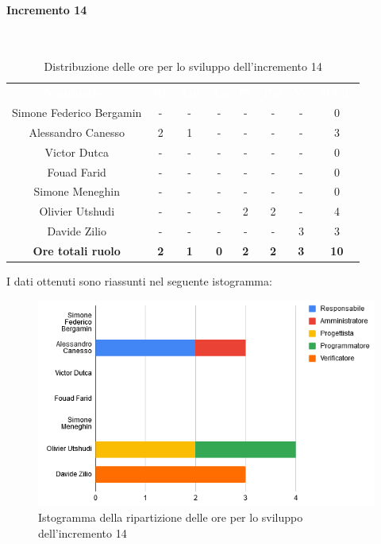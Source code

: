 \paragraph*{Incremento 14} \mbox{} \\
\begin{table}[H]
\centering\renewcommand{\arraystretch}{1.5}
\caption{Distribuzione delle ore per lo sviluppo dell'incremento 14}
\vspace{0.2cm}
\begin{tabular}{ c c c c c c c c }
\rowcolor{redafk}
\textcolor{white}{\textbf{Nominativo}} & \textcolor{white}{\textbf{Re}} &
\textcolor{white}{\textbf{Am}} & \textcolor{white}{\textbf{An}} &
\textcolor{white}{\textbf{Pt}} & \textcolor{white}{\textbf{Pm}} &
\textcolor{white}{\textbf{Ve}} & \textcolor{white}{\textbf{Totale}} \\
Simone Federico Bergamin & - & - & - & - & - & - & 0 \\
Alessandro Canesso & 2 & 1 & - & - & - & - & 3\\
Victor Dutca & - & - & - & - & - & - & 0 \\
Fouad Farid & - & - & - & - & - & - & 0 \\
Simone Meneghin & - & - & - & - & - & - & 0 \\
Olivier Utshudi & - & - & - & 2 & 2 & - & 4 \\
Davide Zilio & - & - & - &- & - & 3 & 3 \\
\rowcolor{lastrowcolor}
\textbf{Ore totali ruolo} & \textbf{2} & \textbf{1} & \textbf{0} & \textbf{2} & \textbf{2} & \textbf{3} & \textbf{10} \\
\end{tabular}
\end{table}

I dati ottenuti sono riassunti nel seguente istogramma:
\begin{figure}[H]
\centering
\includegraphics[scale=0.60]{img/grafici/tabella_inc14.png}
\caption{Istogramma della ripartizione delle ore per lo sviluppo dell'incremento 14}
\end{figure}

